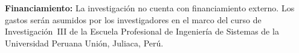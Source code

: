 \bigskip

\noindent\textbf{Financiamiento:} La investigaci\'on no cuenta con
financiamiento externo. Los gastos ser\'an asumidos por los
investigadores en el marco del curso de Investigaci\'on~III de la
Escuela Profesional de Ingenier\'ia de Sistemas de la Universidad
Peruana Uni\'on, Juliaca, Per\'u.

\clearpage